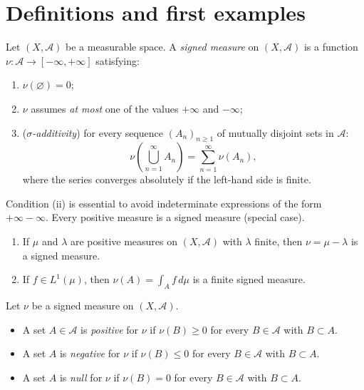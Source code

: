 \section{Definitions and first examples}

\begin{definition}
\label{def:signed_measure}
Let $(X, \mathcal{A})$ be a measurable space. A \emph{signed measure} on
$(X, \mathcal{A})$ is a function $\nu : \mathcal{A} \to [-\infty, +\infty]$
satisfying:
\begin{enumerate}
    \item[(i)] $\nu(\varnothing) = 0$;
    \item[(ii)] $\nu$ assumes \emph{at most} one of the values $+\infty$ and $-\infty$;
    \item[(iii)] (\emph{$\sigma$-additivity}) for every sequence $(A_n)_{n \geq 1}$
    of mutually disjoint sets in $\mathcal{A}$:
    \[
        \nu\!\left(\bigcup_{n=1}^{\infty} A_n\right)
        = \sum_{n=1}^{\infty} \nu(A_n),
    \]
    where the series converges absolutely if the left-hand side is finite.
\end{enumerate}
\end{definition}

\begin{remark}
Condition (ii) is essential to avoid indeterminate expressions of the form
$+\infty - \infty$. Every positive measure is a signed measure (special case).
\end{remark}

\begin{example}
\begin{enumerate}
    \item If $\mu$ and $\lambda$ are positive measures on $(X, \mathcal{A})$ with
    $\lambda$ finite, then $\nu = \mu - \lambda$ is a signed measure.
    \item If $f \in L^1(\mu)$, then $\nu(A) = \int_A f\, d\mu$ is a finite signed
    measure.
\end{enumerate}
\end{example}

\begin{definition}
Let $\nu$ be a signed measure on $(X, \mathcal{A})$.
\begin{itemize}
    \item A set $A \in \mathcal{A}$ is \emph{positive} for $\nu$ if
    $\nu(B) \geq 0$ for every $B \in \mathcal{A}$ with $B \subset A$.
    \item A set $A$ is \emph{negative} for $\nu$ if
    $\nu(B) \leq 0$ for every $B \in \mathcal{A}$ with $B \subset A$.
    \item A set $A$ is \emph{null} for $\nu$ if
    $\nu(B) = 0$ for every $B \in \mathcal{A}$ with $B \subset A$.
\end{itemize}
\end{definition}

